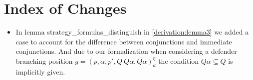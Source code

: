 \section{Index of Changes}

\begin{itemize}
   \item In lemma strategy\_formulas\_distinguish in  \ref{derivation:lemma3} we added a case to account for the difference between 
conjunctions and immediate conjunctions. And due to our formalization when considering a
defender branching position $g=(p,\alpha ,p', Q \ Q\alpha, Q\alpha)_d^\eta$ the condition 
$Q \alpha \subseteq Q$ is implicitly given.
\end{itemize}